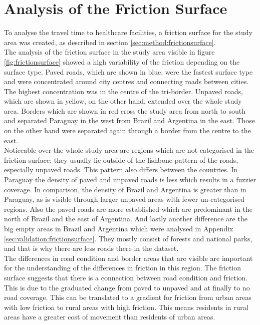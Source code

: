 \documentclass[11pt, a4paper]{report}
\begin{document}
\section{Analysis of the Friction Surface}\label{sec:results:frictionsurface}
To analyse the travel time to healthcare facilities, a friction surface for the study area was created, as described in section \ref{sec:method:frictionsurface}. \\
%
The analysis of the friction surface in the study area visible in figure \ref{fig:frictionsurface} showed a high variability of the friction depending on the surface type. Paved roads, which are shown in blue, were the fastest surface type and were concentrated around city centres and connecting roads between cities. The highest concentration was in the centre of the tri-border. Unpaved roads, which are shown in yellow, on the other hand, extended over the whole study area. Borders which are shown in red cross the study area from north to south and separated Paraguay in the west from Brazil and Argentina in the east. Those on the other hand were separated again through a border from the centre to the east. \\
%
Noticeable over the whole study area are regions which are not categorised in the friction surface; they usually lie outside of the fishbone pattern of the roads, especially unpaved roads. This pattern also differs between the countries. In Paraguay the density of paved and unpaved roads is less which results in a fuzzier coverage. In comparison, the density of Brazil and Argentina is greater than in Paraguay, as is visible through larger unpaved areas with fewer un-categorised regions. Also the paved roads are more established which are predominant in the north of Brazil and the east of Argentina. And lastly another difference are the big empty areas in Brazil and Argentina which were analysed in Appendix \ref{sec:validation:frictionsurface}. They mostly consist of forests and national parks, and that is why there are less roads there in the dataset.\\
%
The differences in road condition and border areas that are visible are important for the understanding of the differences in friction in this region. The friction surface suggests that there is a connection between road condition and friction. This is due to the graduated change from paved to unpaved and at finally to no road coverage. This can be translated to a gradient for friction from urban areas with low friction to rural areas with high friction. This means residents in rural areas have a greater cost of movement than residents of urban areas. 
\end{document}
